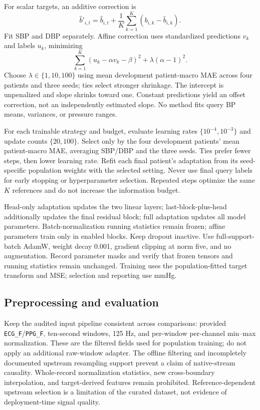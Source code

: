 \documentclass[11pt]{article}
\begin{document}
For scalar targets, an additive correction is
\begin{equation}
 \widehat b'_{i,t}=\widehat b_{i,t}+\frac{1}{K}\sum_{k=1}^{K}(b_{i,k}-\widehat b_{i,k}).
\end{equation}
Fit SBP and DBP separately. Affine correction uses standardized predictions $v_k$ and labels $u_k$, minimizing
\begin{equation}
 \sum_{k=1}^{K}(u_k-\alpha v_k-\beta)^2+\lambda(\alpha-1)^2.
\end{equation}
Choose $\lambda\in\{1,10,100\}$ using mean development patient-macro MAE across four patients and three seeds; ties select stronger shrinkage. The intercept is unpenalized and slope shrinks toward one. Constant predictions yield an offset correction, not an independently estimated slope. No method fits query BP means, variances, or pressure ranges.

For each trainable strategy and budget, evaluate learning rates $\{10^{-4},10^{-3}\}$ and update counts $\{20,100\}$. Select only by the four development patients' mean patient-macro MAE, averaging SBP/DBP and the three seeds. Ties prefer fewer steps, then lower learning rate. Refit each final patient's adaptation from its seed-specific population weights with the selected setting. Never use final query labels for early stopping or hyperparameter selection. Repeated steps optimize the same $K$ references and do not increase the information budget.

Head-only adaptation updates the two linear layers; last-block-plus-head additionally updates the final residual block; full adaptation updates all model parameters. Batch-normalization running statistics remain frozen; affine parameters train only in enabled blocks. Keep dropout inactive. Use full-support-batch AdamW, weight decay 0.001, gradient clipping at norm five, and no augmentation. Record parameter masks and verify that frozen tensors and running statistics remain unchanged. Training uses the population-fitted target transform and MSE; selection and reporting use mmHg.

\subsection{Preprocessing and evaluation}
Keep the audited input pipeline consistent across comparisons: provided \texttt{ECG\_F}/\texttt{PPG\_F}, ten-second windows, 125 Hz, and per-window per-channel min--max normalization. These are the filtered fields used for population training; do not apply an additional raw-window adapter. The offline filtering and incompletely documented upstream resampling support prevent a claim of native-stream causality. Whole-record normalization statistics, new cross-boundary interpolation, and target-derived features remain prohibited. Reference-dependent upstream selection is a limitation of the curated dataset, not evidence of deployment-time signal quality.
\end{document}
